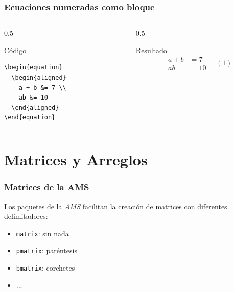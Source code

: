 \documentclass[12pt,aspectratio=169,ignorenonframetext]{ltxbeamer}
\begin{document}
\begin{frame}[fragile]
\frametitle{Ecuaciones numeradas como bloque}

\begin{columns}
    \begin{column}{0.5\textwidth}
        \begin{block}{Código}
\begin{verbatim}
\begin{equation}
  \begin{aligned}
    a + b &= 7 \\
    ab &= 10
  \end{aligned}
\end{equation}
\end{verbatim}
        \end{block}
    \end{column}

    \begin{column}{0.5\textwidth}
        \begin{exampleblock}{Resultado}
            \begin{equation*}
                \begin{aligned}
                    a + b &= 7 \\
                    ab &= 10
                \end{aligned}
                \quad (1)
            \end{equation*}
        \end{exampleblock}
    \end{column}
\end{columns}
\end{frame}



\section{Matrices y Arreglos}
\begin{frame}
\frametitle{Matrices de la AMS}

Los paquetes de la \emph{AMS} facilitan la creación de matrices con diferentes delimitadores:
\begin{itemize}
    \item \texttt{matrix}: sin nada
    \item \texttt{pmatrix}: paréntesis
    \item \texttt{bmatrix}: corchetes
    \item ...
\end{itemize}
\end{frame}
\end{document}
